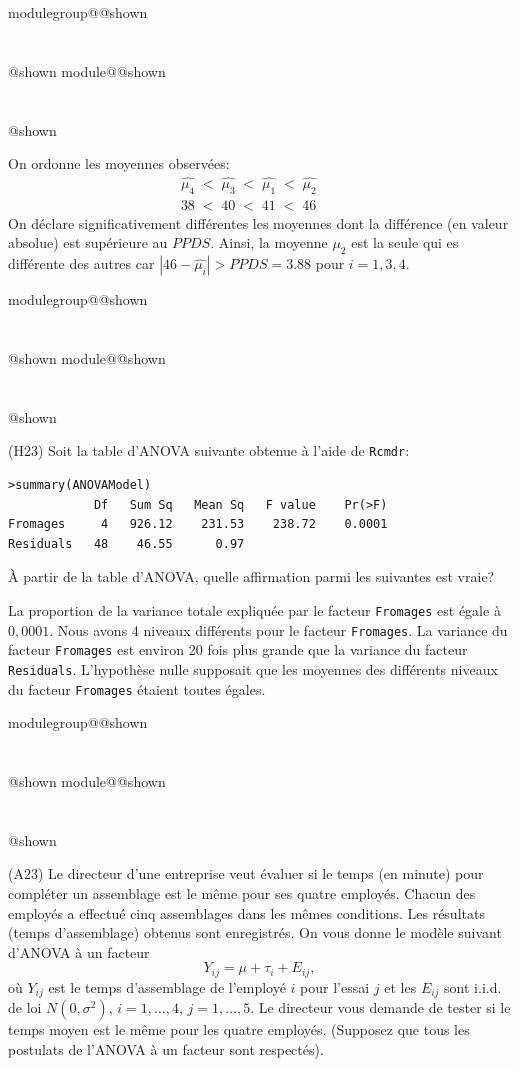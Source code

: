 \documentclass{Evaluation}
\makeatletter
\newcommand{\currentmodulekey}{}
\newcommand{\currentmoduletitle}{}
\newcommand{\currentgroupkey}{}
\newcommand{\currentgrouptitle}{}
\newcommand{\showmoduleifneeded}{%
  \ifx\currentgroupkey\empty\else
    \expandafter\ifx\csname modulegroup@\currentgroupkey @shown\endcsname\relax
      \section*{\currentgrouptitle}%
      \expandafter\gdef\csname modulegroup@\currentgroupkey @shown\endcsname{1}%
    \fi
  \fi
  \expandafter\ifx\csname module@\currentmodulekey @shown\endcsname\relax
    \section*{\currentmoduletitle}%
    \expandafter\gdef\csname module@\currentmodulekey @shown\endcsname{1}%
  \fi
}
\newenvironment{A22}{\showmoduleifneeded}{}
\newenvironment{H23}{\showmoduleifneeded}{}
\newenvironment{A23}{\showmoduleifneeded}{}
\makeatother
\begin{document}
\begin{questions}
\begin{A22}
\begin{parts}
\begin{solution}
    On ordonne les moyennes observées:
\begin{eqnarray*}
   \hat{\mu_4} \; < \; \hat{\mu_3} \; < \; \hat{\mu_1} \; < \; \hat{\mu_2}&&  \\
   38 \; < \; 40 \; < \; 41 \; < \; 46 &&  
\end{eqnarray*}
On déclare significativement différentes les moyennes dont la différence (en valeur absolue) est supérieure au $PPDS$.
Ainsi, la moyenne $\mu_2$ est la seule qui es différente des autres car $|46 -  \hat{\mu_i}| > PPDS= 3.88$ pour $i=1,3,4$.

\end{solution}
\end{parts}
\end{A22}

\begin{H23}
\question
(H23) Soit la table d'ANOVA suivante obtenue à l'aide de \texttt{Rcmdr}:
\begin{verbatim}
>summary(ANOVAModel)
            Df   Sum Sq   Mean Sq   F value    Pr(>F)    
Fromages     4   926.12    231.53    238.72    0.0001 
Residuals   48    46.55      0.97                      
\end{verbatim}

À partir de la table d'ANOVA, quelle affirmation parmi les suivantes est vraie?

\begin{checkboxes}
\choice La proportion de la variance totale expliquée par le facteur \texttt{Fromages} est égale à $0,0001$. 
\choice Nous avons 4 niveaux différents pour le facteur \texttt{Fromages}.
\choice La variance du facteur \texttt{Fromages} est environ 20 fois plus grande que la variance du facteur \texttt{Residuals}.
\correctchoice L'hypothèse nulle supposait que les moyennes des différents niveaux du facteur \texttt{Fromages} étaient toutes égales.
\end{checkboxes}

\vspace{1cm}
\end{H23}

\begin{A23}
\question
(A23) 
Le directeur d'une entreprise veut évaluer si le temps (en minute) pour compléter un assemblage est le même pour ses quatre employés. Chacun des employés a effectué cinq assemblages dans les mêmes conditions. Les résultats (temps d'assemblage) obtenus sont enregistrés. 
On vous donne le modèle suivant d'ANOVA à un facteur
$$Y_{ij}=\mu+\tau_i+E_{ij},$$
où $Y_{ij}$ est le temps d'assemblage de l'employé $i$ pour l'essai $j$ et
les $E_{ij}$ sont i.i.d. de loi $N(0,\sigma^2)$, $i=1,\hdots, 4$,
$j=1,\ldots,5$. 
Le directeur vous demande de tester si le temps moyen est le même pour les quatre employés.
(Supposez que tous les postulats de l'ANOVA à un facteur sont respectés).\medskip


\end{A23}
\end{questions}
\end{document}
